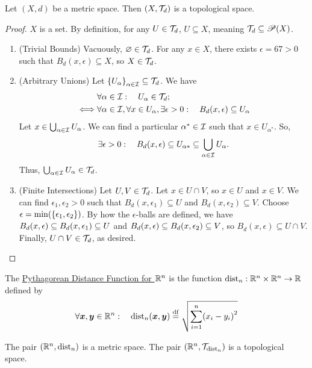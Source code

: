 \documentclass[11pt,reqno]{amsart}
\begin{document}
\begin{lemma}\label{lem:metric-topo}
Let $(X,d)$ be a metric space.
Then $(X,\T_d)$ is a topological space.
\end{lemma}
\begin{proof}
$X$ is a set.
By definition, for any $U\in\T_d$, $U\subseteq X$, meaning $\T_d\subseteq\P(X)$.

\begin{enumerate}
\item (Trivial Bounds)
Vacuously, $\es\in\T_d$.
For any $x\in X$, there exists $\epsilon=67>0$ such that $B_d(x,\epsilon)\subseteq X$, so $X\in\T_d$.

\item (Arbitrary Unions)
Let $\set{U_\alpha}_{\alpha\in\I}\subseteq\T_d$. We have
\[\begin{aligned}
&\forall\alpha\in\I:\quad U_\alpha\in\T_d;\\
\iff
&\forall\alpha\in\I,\forall x\in U_\alpha,\exists\epsilon>0:\quad
B_d(x,\epsilon)\subseteq U_\alpha\\
\end{aligned}\]
Let $x\in\bigcup_{\alpha\in\I}U_\alpha$. We can find a particular $\alpha^*\in\I$ such that
$x\in U_{\alpha^*}$.
So,
\[\exists\epsilon>0:\quad B_d(x,\epsilon)\subseteq U_{\alpha*}\subseteq\bigcup_{\alpha\in\I}U_\alpha.\]
Thus, $\bigcup_{\alpha\in\I}U_\alpha\in\T_d$.

\item (Finite Intersections)
Let $U,V\in\T_d$. Let $x\in U\cap V$, so $x\in U$ and $x\in V$.
We can find $\epsilon_1,\epsilon_2>0$ such that
$B_d(x,\epsilon_1)\subseteq U$ and $B_d(x,\epsilon_2)\subseteq V$.
Choose $\epsilon=\min\Br{\set{\epsilon_1,\epsilon_2}}$.
By how the $\epsilon$-balls are defined, we have
$B_d(x,\epsilon)\ss B_d(x,\epsilon_1)\ss U$
and
$B_d(x,\epsilon)\ss B_d(x,\epsilon_2)\ss V$,
so
$B_d(x,\epsilon)\subseteq U\cap V$.
Finally, $U\cap V\in\T_d$, as desired.
\end{enumerate}
\end{proof}

\begin{Def}
The \ul{Pythagorean Distance Function for $\R^n$} is the function
$\dist_n:\R^n\times\R^n\to \R$ defined by
\[\forall\bm x,\bm y\in\R^n:\quad
\dist_n(\bm x,\bm y)\df\sqrt{\sum_{i=1}^n\Br{x_i-y_i}^2}
\]
\end{Def}

\begin{lemma}\label{lem:euclidean-metric}
The pair $\Br{\R^n,\dist_n}$ is a metric space.
The pair $\Br{\R^n,\T_{\dist_n}}$ is a topological space.
\end{lemma}
\end{document}
